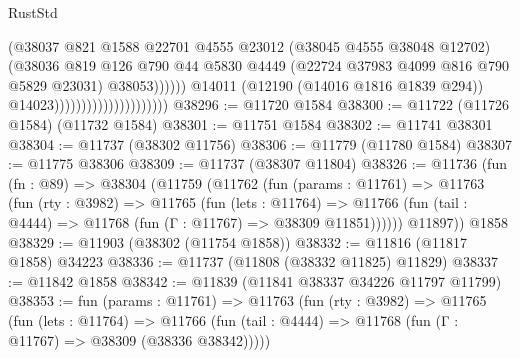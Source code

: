 \begin{lexlean}{RustStd}
\begin{coremodule}
                                                      (@38037
                                                        @821
                                                        @1588
                                                        @22701
                                                        @4555
                                                        @23012
                                                        (@38045 @4555 @38048 @12702)
                                                        (@38036
                                                          @819
                                                          @126
                                                          @790
                                                          @44
                                                          @5830
                                                          @4449
                                                          (@22724
                                                            @37983
                                                            @4099
                                                            @816
                                                            @790
                                                            @5829
                                                            @23031)
                                                          @38053))))))
                                              @14011
                                              (@12190 (@14016 @1816 @1839 @294))
                                              @14023)))))))))))))))))))))
@38296 := @11720 @1584
@38300 := @11722 (@11726 @1584) (@11732 @1584)
@38301 := @11751 @1584
@38302 := @11741 @38301
@38304 := @11737 (@38302 @11756)
@38306 := @11779 (@11780 @1584)
@38307 := @11775 @38306
@38309 := @11737 (@38307 @11804)
@38326 := @11736
    (fun (fn : @89) =>
    @38304
      (@11759
        (@11762
          (fun (params : @11761) =>
          @11763
            (fun (rty : @3982) =>
            @11765
              (fun (lets : @11764) =>
              @11766 (fun (tail : @4444) => @11768 (fun (Γ : @11767) => @38309 @11851))))))
        @11897))
    @1858
@38329 := @11903 (@38302 (@11754 @1858))
@38332 := @11816 (@11817 @1858) @34223
@38336 := @11737 (@11808 (@38332 @11825) @11829)
@38337 := @11842 @1858
@38342 := @11839 (@11841 @38337 @34226 @11797 @11799)
@38353 := fun (params : @11761) =>
  @11763
    (fun (rty : @3982) =>
    @11765
      (fun (lets : @11764) =>
      @11766 (fun (tail : @4444) => @11768 (fun (Γ : @11767) => @38309 (@38336 @38342)))))

\end{coremodule}
\end{lexlean}
